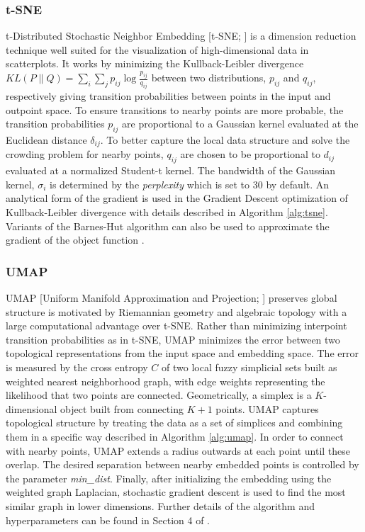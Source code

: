 \documentclass[11pt,a4paper,]{article}
\begin{document}
\hypertarget{t-sne}{%
\subsubsection*{t-SNE}\label{t-sne}}

t-Distributed Stochastic Neighbor Embedding {[}t-SNE; \textcite{Van_der_Maaten2008-dv}{]} is a dimension reduction technique well suited for the visualization of high-dimensional data in scatterplots. It works by minimizing the Kullback-Leibler divergence \(K L(P \| Q)=\sum_{i} \sum_{j} p_{ij} \log \frac{p_{ij}}{q_{ij}}\) between two distributions, \(p_{ij}\) and \(q_{ij}\), respectively giving transition probabilities between points in the input and outpoint space. To ensure transitions to nearby points are more probable, the transition probabilities \(p_{ij}\) are proportional to a Gaussian kernel evaluated at the Euclidean distance \(\delta_{ij}\). To better capture the local data structure and solve the crowding problem\autocite{Van_der_Maaten2008-dv} for nearby points, \(q_{ij}\) are chosen to be proportional to \(d_{ij}\) evaluated at a normalized Student-t kernel. The bandwidth of the Gaussian kernel, \(\sigma_i\) is determined by the \emph{perplexity} which is set to 30 by default. An analytical form of the gradient is used in the Gradient Descent optimization of Kullback-Leibler divergence with details described in Algorithm \ref{alg:tsne}. Variants of the Barnes-Hut algorithm can also be used to approximate the gradient of the object function \autocite{Van_Der_Maaten2014-in}.

\hypertarget{umap}{%
\subsubsection*{UMAP}\label{umap}}

UMAP {[}Uniform Manifold Approximation and Projection; \textcite{McInnes2018-xo}{]} preserves global structure is motivated by Riemannian geometry and algebraic topology with a large computational advantage over t-SNE. Rather than minimizing interpoint transition probabilities as in t-SNE, UMAP minimizes the error between two topological representations from the input space and embedding space. The error is measured by the cross entropy \(C\) of two local fuzzy simplicial sets built as weighted nearest neighborhood graph, with edge weights representing the likelihood that two points are connected. Geometrically, a simplex is a \(K\)-dimensional object built from connecting \(K+1\) points. UMAP captures topological structure by treating the data as a set of simplices and combining them in a specific way described in Algorithm \ref{alg:umap}.
In order to connect with nearby points, UMAP extends a radius outwards at each point until these overlap. The desired separation between nearby embedded points is controlled by the parameter \textit{min\_dist}. Finally, after initializing the embedding using the weighted graph Laplacian, stochastic gradient descent is used to find the most similar graph in lower dimensions. Further details of the algorithm and hyperparameters can be found in Section 4 of \textcite{McInnes2018-xo}.
\end{document}
